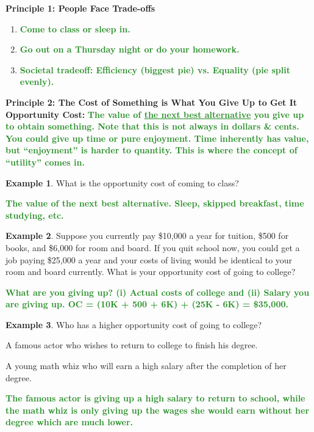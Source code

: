 \documentclass[11pt]{article}\usepackage[]{graphicx}\usepackage[]{color}
\theoremstyle{definition}
\newtheorem{exmp}{Example}[section]
\newcommand{\blank}[1]{}
\newcommand{\ddp}[1]{{\textbf{\textcolor{ForestGreen}{#1}}}}
\newcommand{\defn}[1]{\textbf{#1}}
\begin{document}
	\textbf{Principle 1: People Face Trade-offs}

	\begin{enumerate}
		\item \ddp{Come to class or sleep in.}
		\item \ddp{Go out on a Thursday night or do your homework.}
		\item \ddp{Societal tradeoff: Efficiency (biggest pie) vs. Equality (pie split evenly).}
	\end{enumerate}
	
	\textbf{Principle 2: The Cost of Something is What You Give Up to Get It}
	\\
	
	\defn{Opportunity Cost:} \blank{} \ddp{The value of \underline{the next best alternative} you give up to obtain something. Note that this is not always in dollars \& cents. You could give up time or pure enjoyment. Time inherently has value, but ``enjoyment'' is harder to quantity. This is where the concept of ``utility'' comes in.}
	
	\begin{exmp}
		What is the opportunity cost of coming to class?
	\end{exmp} 
	
	\ddp{The value of the next best alternative. Sleep, skipped breakfast, time studying, etc.}

	\begin{exmp} 
		Suppose you currently pay \$10,000 a year for tuition, \$500 for books, and \$6,000 for room and board. If you quit school now, you could get a job paying \$25,000 a year and your costs of living would be identical to your room and board currently. What is your opportunity cost of going to college?
	\end{exmp}
	\blank{}
	\ddp{What are you giving up? (i) Actual costs of college and (ii) Salary you are giving up. OC = (10K + 500 + 6K) + (25K - 6K) = \$35,000.}
	
	\begin{exmp} 
		Who has a higher opportunity cost of going to college?
	\begin{enumerate}[(a)]
		{\setlength\itemindent{25pt}\item A famous actor who wishes to return to college to finish his degree.}
		{\setlength\itemindent{25pt}\item A young math whiz who will earn a high salary after the completion of her degree.}
	\end{enumerate}
	\end{exmp}
	\blank{}
	\ddp{The famous actor is giving up a high salary to return to school, while the math whiz is only giving up the wages she would earn without her degree which are much lower.\\}
	
\end{document}
